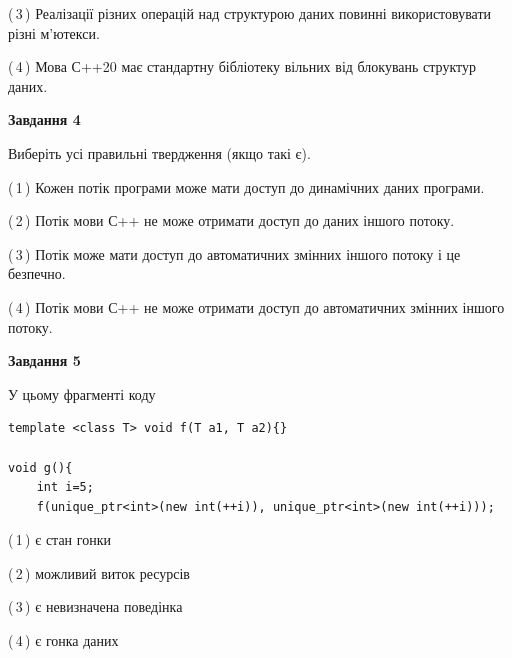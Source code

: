 \documentclass[12pt, ukrainian]{article}
\begin{document}
\begin {large}
{(\,3\,) Реалізації різних операцій над структурою даних повинні використовувати різні м’ютекси.%

(\,4\,) Мова С++20 має стандартну бібліотеку вільних від блокувань структур даних.%



\begin{center}
\textbf{Завдання 4}
\end{center}
Виберіть усі правильні твердження (якщо такі є).\par
\vspace{2mm}

(\,1\,) Кожен потік програми може мати доступ до динамічних даних програми.%

(\,2\,) Потік мови С++ не може отримати доступ до даних іншого потоку.%

(\,3\,) Потік може мати доступ до автоматичних змінних іншого потоку і це безпечно.%

(\,4\,) Потік мови С++ не може отримати доступ до автоматичних змінних іншого потоку.%



\begin{center}
\textbf{Завдання 5}
\end{center}
У цьому фрагменті коду
\begin{verbatim}
template <class T> void f(T a1, T a2){}

void g(){
    int i=5;
    f(unique_ptr<int>(new int(++i)), unique_ptr<int>(new int(++i)));
\end{verbatim}

(\,1\,) є стан гонки%

(\,2\,) можливий виток ресурсів%

(\,3\,) є невизначена поведінка%

(\,4\,) є гонка даних%


}
\end {large}
\end{document}
